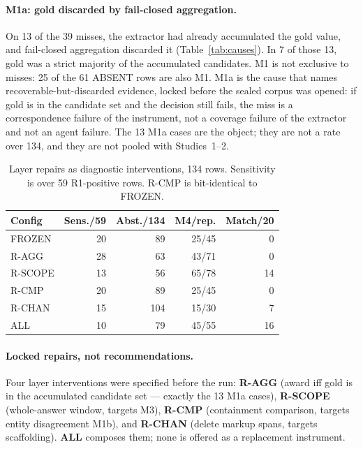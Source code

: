\documentclass[sigconf,anonymous]{aamas}
\begin{document}
\paragraph{M1a: gold discarded by fail-closed aggregation.}
On 13 of the 39 misses, the extractor had already accumulated the gold value, and fail-closed aggregation discarded it (Table~\ref{tab:causes}).
In 7 of those 13, gold was a strict majority of the accumulated candidates.
M1 is not exclusive to misses: 25 of the 61 ABSENT rows are also M1.
M1a is the cause that names recoverable-but-discarded evidence, locked before the sealed corpus was opened: if gold is in the candidate set and the decision still fails, the miss is a correspondence failure of the instrument, not a coverage failure of the extractor and not an agent failure.
The 13 M1a cases are the object; they are not a rate over 134, and they are not pooled with Studies~1--2.

\begin{table}[t]
\centering
\caption{Layer repairs as diagnostic interventions, 134 rows. Sensitivity is over 59 R1-positive rows. R-CMP is bit-identical to FROZEN.}
\label{tab:repairs}
\scriptsize
\setlength{\tabcolsep}{3.2pt}
\begin{tabular}{lrrrr}
\toprule
Config & Sens./59 & Abst./134 & M4/rep. & Match/20 \\
\midrule
FROZEN  & 20 &  89 & 25/45 &  0 \\
R-AGG   & 28 &  63 & 43/71 &  0 \\
R-SCOPE & 13 &  56 & 65/78 & 14 \\
R-CMP   & 20 &  89 & 25/45 &  0 \\
R-CHAN  & 15 & 104 & 15/30 &  7 \\
ALL     & 10 &  79 & 45/55 & 16 \\
\bottomrule
\end{tabular}
\end{table}

\paragraph{Locked repairs, not recommendations.}
Four layer interventions were specified before the run: \textbf{R-AGG} (award iff gold is in the accumulated candidate set --- exactly the 13 M1a cases), \textbf{R-SCOPE} (whole-answer window, targets M3), \textbf{R-CMP} (containment comparison, targets entity disagreement M1b), and \textbf{R-CHAN} (delete markup spans, targets scaffolding).
\textbf{ALL} composes them; none is offered as a replacement instrument.
\end{document}
